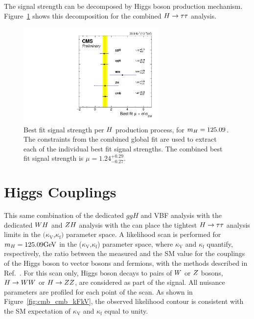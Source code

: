 The signal strength can be decomposed by Higgs boson production 
mechanism. Figure~\ref{fig:cmb_mu_higgs_processes} shows this decomposition for
the combined $H\to\tau\tau$ analysis. 

\begin{figure}[!ht]
 \begin{center}
  \includegraphics[width=0.65\textwidth]{higgs_to_taus_vh/plots/combined/mu_higgs_procs.pdf}
 \end{center}
 \caption{
 Best fit signal strength per $H$ production process, for $m_{H} = 125.09$\GeV.
 The constraints from the combined global fit are used to extract each of the 
 individual best fit signal strengths. The combined best fit signal strength 
 is $\mu = 1.24 ^{+0.29} _{-0.27}$.
 }
 \label{fig:cmb_mu_higgs_processes}
\end{figure}



\section{Higgs Couplings}
This same combination of the dedicated $ggH$ and VBF analysis with 
the dedicated $WH$ and $ZH$ analysis with the can place the tightest
$H\to\tau\tau$ analysis limits in the $(\kappa_\text{V}$,$\kappa_\text{f})$ parameter space.
A likelihood scan is performed for $m_{H}=125.09\mathrm{GeV}$ in the ($\kappa_\text{V}$,$\kappa_\text{f}$) 
parameter space, where $\kappa_\text{V}$ and $\kappa_\text{f}$ quantify, respectively, 
the ratio between the measured and the SM value for the couplings of the Higgs boson to 
vector bosons and fermions, with the methods described in Ref.~\cite{Chatrchyan:2014nva}. 
For this scan only, Higgs boson decays to pairs of $W$ or $Z$ bosons, $H\to WW$ or $H\to ZZ$,
are considered as part of 
the signal. 
All nuisance 
parameters are profiled for each point of the scan. As shown in 
Figure~\ref{fig:cmb_cmb_kFkV}, the observed likelihood contour is consistent with the SM expectation 
of $\kappa_\text{V}$ and $\kappa_\text{f}$ equal to unity.

